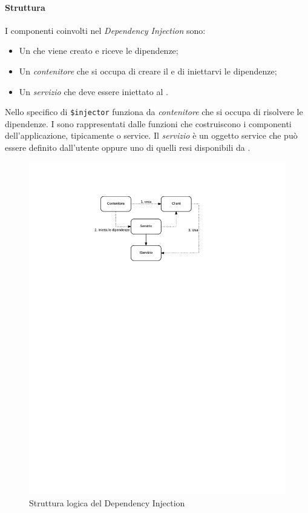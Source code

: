 \paragraph{Struttura}
I componenti coinvolti nel \textit{Dependency Injection} sono:
\begin{itemize}
\item Un \textit{} che viene creato e riceve le dipendenze;
\item Un \textit{contenitore} che si occupa di creare il  e di iniettarvi le dipendenze;
\item Un \textit{servizio} che deve essere iniettato al .
\end{itemize}
Nello specifico di  \texttt{\$injector} funziona da \textit{contenitore} che si occupa di risolvere le dipendenze. I \textit{} sono rappresentati dalle funzioni che costruiscono i componenti dell'applicazione, tipicamente  o service. Il \textit{servizio} è un oggetto service che può essere definito dall'utente oppure uno di quelli resi disponibili da .\\
\begin{center}
\begin{figure}[h]
\centering
\includegraphics[scale=1,keepaspectratio]{diagrammi/designPatterns/dependencyInjection.pdf}
\caption{Struttura logica del Dependency Injection}
\end{figure}
\FloatBarrier
\end{center}

